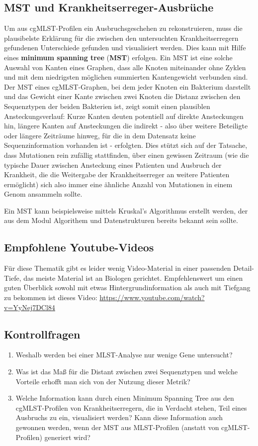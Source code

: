 \subsection{MST und Krankheitserreger-Ausbrüche}

Um aus cgMLST-Profilen ein Ausbruchsgeschehen zu rekonstruieren, muss die plausibelste Erklärung für die zwischen den untersuchten Krankheitserregern gefundenen Unterschiede gefunden und visualisiert werden. Dies kann mit Hilfe eines \textbf{minimum spanning tree} (\textbf{MST}) erfolgen. Ein MST ist eine solche Auswahl von Kanten eines Graphen, dass alle Knoten miteinander ohne Zyklen und mit dem niedrigsten möglichen summierten Kantengewicht verbunden sind. Der MST eines cgMLST-Graphen, bei dem jeder Knoten ein Bakterium darstellt und das Gewicht einer Kante zwischen zwei Knoten die Distanz zwischen den Sequenztypen der beiden Bakterien ist, zeigt somit einen plausiblen Ansteckungsverlauf: Kurze Kanten deuten potentiell auf direkte Ansteckungen hin, längere Kanten auf Ansteckungen die indirekt - also über weitere Beteiligte oder längere Zeiträume hinweg, für die in dem Datensatz keine Sequenzinformation vorhanden ist - erfolgten. Dies stützt sich auf der Tatsache, dass Mutationen rein zufällig stattfinden, über einen gewissen Zeitraum (wie die typische Dauer zwischen Ansteckung eines Patienten und Ausbruch der Krankheit, die die Weitergabe der Krankheitserreger an weitere Patienten ermöglicht) sich also immer eine ähnliche Anzahl von Mutationen in einem Genom ansammeln sollte. 

Ein MST kann beispielsweise mittels Kruskal's Algorithmus erstellt werden, der aus dem Modul Algorithem und Datenstrukturen bereits bekannt sein sollte. 

\subsection{Empfohlene Youtube-Videos}

Für diese Thematik gibt es leider wenig Video-Material in einer passenden Detail-Tiefe, das meiste Material ist an Biologen gerichtet. Empfehlenswert um einen guten Überblick sowohl mit etwas Hintergrundinformation als auch mit Tiefgang zu bekommen ist dieses Video: \href{https://www.youtube.com/watch?v=YyNej7DCl84}{https://www.youtube.com/watch?v=YyNej7DCl84}

\subsection{Kontrollfragen}
\begin{enumerate}
	\item Weshalb werden bei einer MLST-Analyse nur wenige Gene untersucht?
	\item Was ist das Maß für die Distant zwischen zwei Sequenztypen und welche Vorteile erhofft man sich von der Nutzung dieser Metrik?
	\item Welche Information kann durch einen Minimum Spanning Tree aus den cgMLST-Profilen von Krankheitserregern, die in Verdacht stehen, Teil eines Ausbruchs zu ein, visualisiert werden? Kann diese Information auch gewonnen werden, wenn der MST aus MLST-Profilen (anstatt von cgMLST-Profilen) generiert wird?
\end{enumerate}
